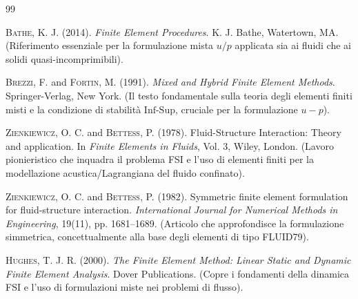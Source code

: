 \documentclass{article}
\begin{document}
\begin{thebibliography}{99}


\textsc{Bathe, K. J.} (2014).
\emph{Finite Element Procedures}.
K. J. Bathe, Watertown, MA.
(Riferimento essenziale per la formulazione mista $u/p$ applicata sia ai fluidi che ai solidi quasi-incomprimibili).

\textsc{Brezzi, F.} and \textsc{Fortin, M.} (1991).
\emph{Mixed and Hybrid Finite Element Methods}.
Springer-Verlag, New York.
(Il testo fondamentale sulla teoria degli elementi finiti misti e la condizione di stabilità $\text{Inf-Sup}$, cruciale per la formulazione $u-p$).


\textsc{Zienkiewicz, O. C.} and \textsc{Bettess, P.} (1978).
Fluid-Structure Interaction: Theory and application.
In \emph{Finite Elements in Fluids}, Vol. 3, Wiley, London.
(Lavoro pionieristico che inquadra il problema FSI e l'uso di elementi finiti per la modellazione acustica/Lagrangiana del fluido confinato).

\textsc{Zienkiewicz, O. C.} and \textsc{Bettess, P.} (1982).
Symmetric finite element formulation for fluid-structure interaction.
\emph{International Journal for Numerical Methods in Engineering}, 19(11), pp. 1681--1689.
(Articolo che approfondisce la formulazione simmetrica, concettualmente alla base degli elementi di tipo FLUID79).


\textsc{Hughes, T. J. R.} (2000).
\emph{The Finite Element Method: Linear Static and Dynamic Finite Element Analysis}.
Dover Publications.
(Copre i fondamenti della dinamica FSI e l'uso di formulazioni miste nei problemi di flusso).

\end{thebibliography}
\end{document}

